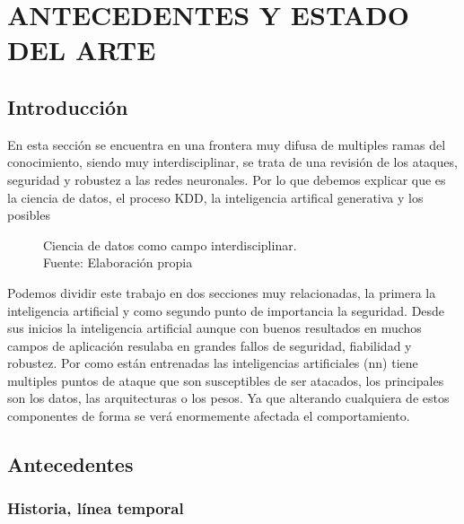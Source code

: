\chapter{ANTECEDENTES Y ESTADO DEL ARTE}
\label{ch:2}
\section{Introducción}

En esta sección se encuentra en una frontera muy difusa de multiples ramas del conocimiento, siendo muy interdisciplinar, se trata de una revisión de los ataques, seguridad y robustez a las redes neuronales.
Por lo que debemos explicar que es la ciencia de datos, el proceso \gls{KDD}, la inteligencia artifical generativa y los posibles

\begin{figure}[H]
  \centering
  \centerline{}
  \caption{Ciencia de datos como campo interdisciplinar.\\Fuente: Elaboración propia}
  \label{fig:ciencia-de-datos}
\end{figure}

Podemos dividir este trabajo en dos secciones muy relacionadas, la primera la inteligencia artificial y como segundo punto de importancia la seguridad.
Desde sus inicios la inteligencia artificial aunque con buenos resultados en muchos campos de aplicación resulaba en grandes fallos de seguridad, fiabilidad y robustez.
Por como están entrenadas las inteligencias artificiales (\acrshort{nn}) tiene multiples puntos de ataque que son susceptibles de ser atacados, los principales son los datos, las arquitecturas o los pesos.
Ya que alterando cualquiera de estos componentes de forma se verá enormemente afectada el comportamiento.



\section{Antecedentes}


\subsection{Historia, línea temporal}

